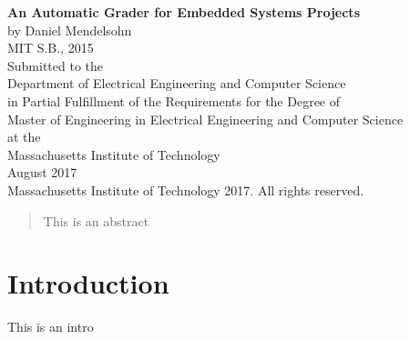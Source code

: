 \documentclass[12pt]{article}
\begin{document}
\begin{titlepage}
\centering
\textbf{An Automatic Grader for Embedded Systems Projects} \\
\vspace{12pt}
by Daniel Mendelsohn \\
MIT S.B., 2015 \\
\vspace{12pt}
Submitted to the \\
Department of Electrical Engineering and Computer Science \\
in Partial Fulfillment of the Requirements for the Degree of \\
\vspace{12pt}
Master of Engineering in Electrical Engineering and Computer Science \\
\vspace{12pt}
at the \\
\vspace{12pt}
Massachusetts Institute of Technology \\
\vspace{12pt}
August 2017 \\
\vspace{12pt}
\textcopyright \hspace{0.05in} Massachusetts Institute of Technology 2017.  All rights reserved.
\end{titlepage}

\begin{abstract}
This is an abstract
\end{abstract}

\section{Introduction}
This is an intro
\end{document}
